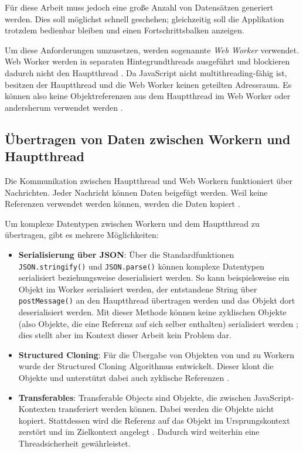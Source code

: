 Für diese Arbeit muss jedoch eine große Anzahl von Datensätzen generiert werden. Dies soll möglichst schnell geschehen; gleichzeitig soll die Applikation trotzdem bedienbar bleiben und einen Fortschrittsbalken anzeigen.

Um diese Anforderungen umzusetzen, werden sogenannte \textit{Web Worker} verwendet. Web Worker werden in separaten Hintegrundthreads ausgeführt und blockieren dadurch nicht den Hauptthread \cite{mdn:webworkers}. Da JavaScript nicht multithreading-fähig ist, besitzen der Hauptthread und die Web Worker keinen geteilten Adressraum. Es können also keine Objektreferenzen aus dem Hauptthread im Web Worker oder andersherum verwendet werden \cite{mdn:webworkers}.

\subsection{Übertragen von Daten zwischen Workern und Hauptthread}

Die Kommunikation zwischen Hauptthread und Web Workern funktioniert über Nachrichten. Jeder Nachricht können Daten beigefügt werden. Weil keine Referenzen verwendet werden können, werden die Daten kopiert \cite{mdn:webworkers}.

Um komplexe Datentypen zwischen Workern und dem Hauptthread zu übertragen, gibt es mehrere Möglichkeiten:
\begin{itemize}
    \item \textbf{Serialisierung über JSON}: Über die Standardfunktionen \texttt{JSON.stringify()} und \texttt{JSON.parse()} können komplexe Datentypen serialisiert beziehungsweise deserialisiert werden. So kann beispielsweise ein Objekt im Worker serialisiert werden, der entstandene String über \texttt{postMessage()} an den Hauptthread übertragen werden und das Objekt dort deserialisiert werden. Mit dieser Methode können keine zyklischen Objekte (also Objekte, die eine Referenz auf sich selber enthalten) serialisiert werden \cite{mdn:json_stringify}; dies stellt aber im Kontext dieser Arbeit kein Problem dar.
    \item \textbf{Structured Cloning}: Für die Übergabe von Objekten von und zu Workern wurde der Structured Cloning Algorithmus entwickelt. Dieser klont die Objekte und unterstützt dabei auch zyklische Referenzen \cite{mdn:structured_cloning}.
    \item \textbf{Transferables}: Transferable Objects sind Objekte, die zwischen JavaScript-Kon\-texten transferiert werden können. Dabei werden die Objekte nicht kopiert. Stattdessen wird die Referenz auf das Objekt im Ursprungskontext zerstört und im Zielkontext angelegt \cite{googledev:transferables}. Dadurch wird weiterhin eine Threadsicherheit gewährleistet.
\end{itemize}

